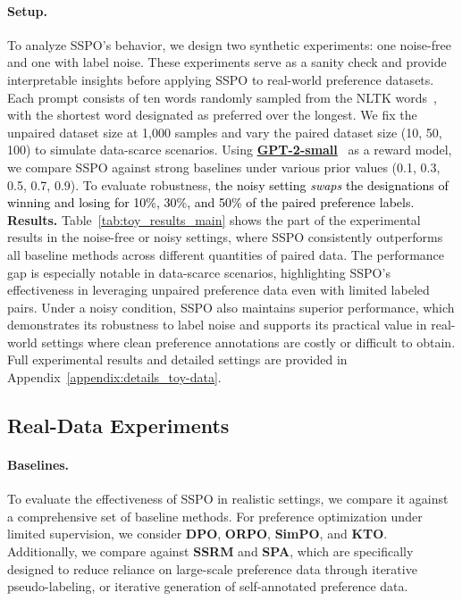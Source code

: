 \documentclass{article} %
\newcommand\fix[1]{\textcolor{black}{#1}}
\begin{document}
\paragraph{Setup.} To analyze SSPO's behavior, we design two synthetic experiments: one noise-free and one with label noise. These experiments serve as a sanity check and provide interpretable insights before applying SSPO to real-world preference datasets. Each prompt consists of ten words randomly sampled from the NLTK words~\citep{loper2002nltk}, with the shortest word designated as preferred over the longest. We fix the unpaired dataset size at 1,000 samples and vary the paired dataset size (10, 50, 100) to simulate data-scarce scenarios. Using \href{https://huggingface.co/openai-community/gpt2}{\textbf{GPT-2-small}}~\citep{radford2019language} as a reward model, we compare SSPO against strong baselines under various prior values (0.1, 0.3, 0.5, 0.7, 0.9). To evaluate robustness, \fix{the noisy setting \textit{swaps} the designations of winning and losing for 10\%, 30\%, and 50\% of the paired preference labels.}
\vspace{4pt}
\\ \noindent \textbf{Results.} Table~\ref{tab:toy_results_main} shows the part of the experimental results in the noise-free or noisy settings, where SSPO consistently outperforms all baseline methods across different quantities of paired data. The performance gap is especially notable in data-scarce scenarios, highlighting SSPO’s effectiveness in leveraging unpaired preference data even with limited labeled pairs. Under a noisy condition, SSPO also maintains superior performance, which demonstrates its robustness to label noise and supports its practical value in real-world settings where clean preference annotations are costly or difficult to obtain. Full experimental results and detailed settings are provided in Appendix~\ref{appendix:details_toy-data}.

\subsection{Real-Data Experiments}
\label{sec:real_setup}

\paragraph{Baselines.} To evaluate the effectiveness of SSPO in realistic settings, we compare it against a comprehensive set of baseline methods. For preference optimization under limited supervision, we consider \textbf{DPO}, \textbf{ORPO}, \textbf{SimPO}, and \textbf{KTO}. Additionally, we compare against \textbf{SSRM} and \textbf{SPA}, which are specifically designed to reduce reliance on large-scale preference data through iterative pseudo-labeling, or iterative generation of self-annotated preference data.
\end{document}
